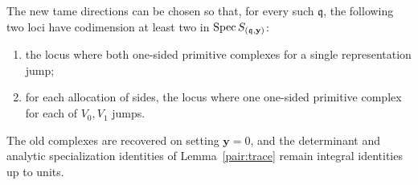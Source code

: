 \begin{proposition}\label{unit:simultaneous-jumps}
The new tame directions can be chosen so that, for every such
$\mathfrak q$, the following two loci have codimension at least two
in $\operatorname{Spec} S_{(\mathfrak q,\mathbf y)}$:
\begin{enumerate}
\item the locus where both one-sided primitive complexes for a
single representation jump;
\item for each allocation of sides, the locus where one one-sided
primitive complex for each of $V_0,V_1$ jumps.
\end{enumerate}
The old complexes are recovered on setting $\mathbf y=0$, and
the determinant and analytic specialization identities of
Lemma~\ref{pair:trace} remain integral identities up to units.
\end{proposition}

